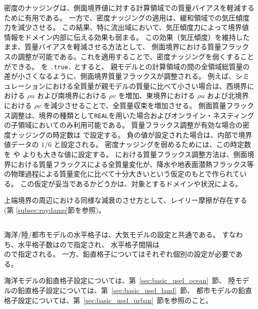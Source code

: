 密度のナッジングは、側面境界値に対する計算領域での質量バイアスを軽減するために有用である。
一方で、密度ナッジングの適用は、緩和領域での気圧傾度力を減少させる。
この結果、特に流出域において、気圧傾度力によって境界値情報をドメイン内部に伝える効果も弱まる。
この効果（気圧傾度）を維持したまま、質量バイアスを軽減させる方法として、
側面境界における質量フラックスの調整が可能である。これを適用することで、密度ナッジングを弱くすることができる。
%
 を \verb|.true.| とすると、
親モデルと\scale の計算領域の間の全領域総質量の差が小さくなるように、側面境界質量フラックスが調整される。
例えば、シミュレーションにおける全質量が親モデルの質量に比べて小さい場合は、西境界における $\rho u$ および南境界における $\rho v$ を増加、東境界における $\rho u$ および北境界における $\rho v$ を減少させることで、全質量収束を増加させる。
側面質量フラックス調整は、境界の種類として\verb|REAL|を用いた場合およびオンライン・ネスティングの子領域においてのみ利用可能である。
質量フラックス調整が有効な場合の密度ナッジングの時定数は  で設定する。
負の値が設定された場合は、内部で境界値データの $1/6$ と設定される。
密度ナッジングを弱めるためには、この時定数を  や  よりも大きな値に設定する。
\scalerm における質量フラックス調整方法は、側面境界における質量フラックスによる全質量変化が、降水や地表面潜熱フラックス等の物理過程による質量変化に比べて十分大きいという仮定のもとで作られている。
この仮定が妥当であるかどうかは、対象とするドメインや状況による。


上端境界の周辺における同様な減衰のさせ方として、レイリー摩擦が存在する(第 \ref{subsec:raydamp}節を参照)。

\subsection{\SubsecGridOceanLandUrban} \label{subsec:gridolu}

海洋/陸/都市モデルの水平格子は、大気モデルの設定と共通である。
すなわち、水平格子数はので指定され、
水平格子間隔は \\ ので指定される。
一方、鉛直格子についてはそれぞれ個別の設定が必要である。

海洋モデルの鉛直格子設定については、第~\ref{sec:basic_usel_ocean}~節、
陸モデルの鉛直格子設定については、第~\ref{sec:basic_usel_land}~節、
都市モデルの鉛直格子設定については、第~\ref{sec:basic_usel_urban}~節を参照のこと。

